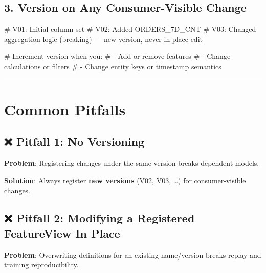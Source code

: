 \documentclass[
  letterpaper,
  DIV=11,
  numbers=noendperiod]{scrreprt}
\newenvironment{Shaded}{\begin{snugshade}}{\end{snugshade}}
\newcommand{\CommentTok}[1]{\textcolor[rgb]{0.37,0.37,0.37}{#1}}
\begin{document}
\hypertarget{version-on-any-consumer-visible-change}{%
\subsection{3. Version on Any Consumer-Visible
Change}\label{version-on-any-consumer-visible-change}}

\begin{Shaded}
\begin{Highlighting}[]
\CommentTok{\# V01: Initial column set}
\CommentTok{\# V02: Added ORDERS\_7D\_CNT}
\CommentTok{\# V03: Changed aggregation logic (breaking) — new version, never in{-}place edit}

\CommentTok{\# Increment version when you:}
\CommentTok{\# {-} Add or remove features}
\CommentTok{\# {-} Change calculations or filters}
\CommentTok{\# {-} Change entity keys or timestamp semantics}
\end{Highlighting}
\end{Shaded}

\begin{center}\rule{0.5\linewidth}{0.5pt}\end{center}

\hypertarget{common-pitfalls-2}{%
\section{Common Pitfalls}\label{common-pitfalls-2}}

\hypertarget{pitfall-1-no-versioning}{%
\subsection{❌ Pitfall 1: No Versioning}\label{pitfall-1-no-versioning}}

\textbf{Problem}: Registering changes under the same version breaks
dependent models.

\textbf{Solution}: Always register \textbf{new versions} (V02, V03,
\ldots) for consumer-visible changes.

\hypertarget{pitfall-2-modifying-a-registered-featureview-in-place}{%
\subsection{❌ Pitfall 2: Modifying a Registered FeatureView In
Place}\label{pitfall-2-modifying-a-registered-featureview-in-place}}

\textbf{Problem}: Overwriting definitions for an existing name/version
breaks replay and training reproducibility.
\end{document}
